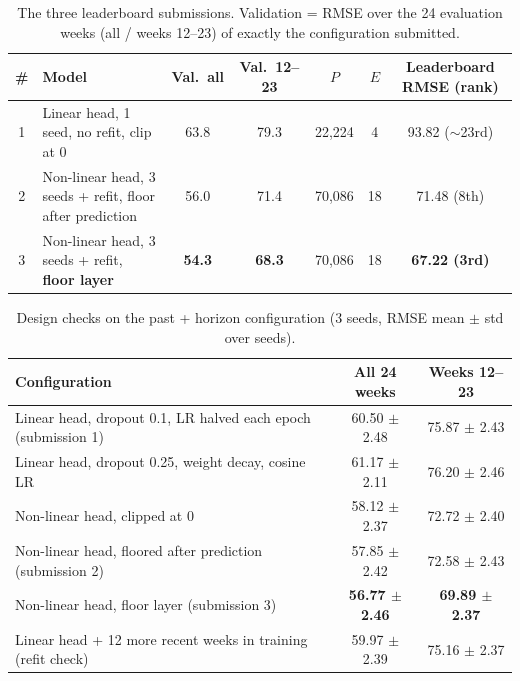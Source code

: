 \begin{table}[H]\centering\small
\caption{The three leaderboard submissions. Validation = RMSE over the 24 evaluation weeks (all / weeks 12--23) of exactly the configuration submitted.}
\label{tab:t2subs}
\begin{tabular}{clccccc}
\toprule
\# & Model & Val.\ all & Val.\ 12--23 & $P$ & $E$ & Leaderboard RMSE (rank)\\
\midrule
1 & Linear head, 1 seed, no refit, clip at 0 & 63.8 & 79.3 & 22{,}224 & 4 & 93.82 ($\sim$23rd)\\
2 & Non-linear head, 3 seeds + refit, floor after prediction & 56.0 & 71.4 & 70{,}086 & 18 & 71.48 (8th)\\
3 & Non-linear head, 3 seeds + refit, \textbf{floor layer} & \textbf{54.3} & \textbf{68.3} & 70{,}086 & 18 & \textbf{67.22 (3rd)}\\
\bottomrule
\end{tabular}
\end{table}

\begin{table}[H]\centering\small
\caption{Design checks on the past + horizon configuration (3 seeds, RMSE mean $\pm$ std over seeds).}
\label{tab:t2design}
\begin{tabular}{lcc}
\toprule
Configuration & All 24 weeks & Weeks 12--23\\
\midrule
Linear head, dropout 0.1, LR halved each epoch (submission 1) & 60.50 $\pm$ 2.48 & 75.87 $\pm$ 2.43\\
Linear head, dropout 0.25, weight decay, cosine LR & 61.17 $\pm$ 2.11 & 76.20 $\pm$ 2.46\\
Non-linear head, clipped at 0 & 58.12 $\pm$ 2.37 & 72.72 $\pm$ 2.40\\
Non-linear head, floored after prediction (submission 2) & 57.85 $\pm$ 2.42 & 72.58 $\pm$ 2.43\\
Non-linear head, floor layer (submission 3) & \textbf{56.77 $\pm$ 2.46} & \textbf{69.89 $\pm$ 2.37}\\
\midrule
Linear head + 12 more recent weeks in training (refit check) & 59.97 $\pm$ 2.39 & 75.16 $\pm$ 2.37\\
\bottomrule
\end{tabular}
\end{table}

